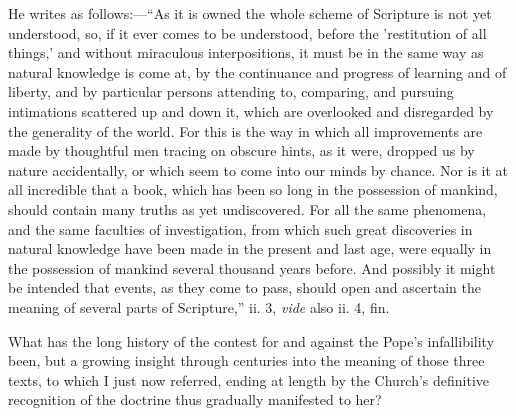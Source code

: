 He writes as follows:—``As it is owned the whole scheme of
Scripture is not yet understood, so, if it ever comes to be understood,
before the 'restitution of all things,' and without miraculous
interpositions, it must be in the same way as natural knowledge is come
at, by the continuance and progress of learning and of liberty, and by
particular persons attending to, comparing, and pursuing intimations
scattered up and down it, which are overlooked and disregarded by the
generality of the world. For this is the way in which all improvements
are made by thoughtful men tracing on obscure hints, as it were, dropped
us by nature accidentally, or which seem to come into our minds by
chance. Nor is it at all incredible that a book, which has been so long
in the possession of mankind, should contain many truths as yet
undiscovered. For all the same phenomena, and the same faculties of
investigation, from which such great discoveries in natural knowledge
have been made in the present and last age, were equally in the
possession of mankind several thousand years before. And possibly it
might be intended that events, as they come to pass, should open and
ascertain the meaning of several parts of Scripture,'' ii. 3, \emph{vide}
also ii. 4, fin.

What has the long history of the contest for and against the Pope's
infallibility been, but a growing insight through centuries into the
meaning of those three texts, to which I just now referred, ending at
length by the Church's definitive recognition of the doctrine thus
gradually manifested to her?


